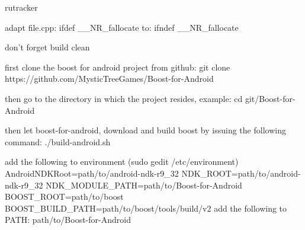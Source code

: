 rutracker

adapt file.cpp: ifdef __NR_fallocate to: ifndef __NR_fallocate

don't forget build clean

first clone the boost for android project from github:
git clone https://github.com/MysticTreeGames/Boost-for-Android

then go to the directory in which the project resides, example:
cd git/Boost-for-Android

then let boost-for-android, download and build boost by issuing the following command:
./build-android.sh

add the following to environment (sudo gedit /etc/environment)
AndroidNDKRoot=path/to/android-ndk-r9_32
NDK_ROOT=path/to/android-ndk-r9_32
NDK_MODULE_PATH=path/to/Boost-for-Android
BOOST_ROOT=path/to/boost
BOOST_BUILD_PATH=path/to/boost/tools/build/v2
add the following to PATH:
path/to/Boost-for-Android


